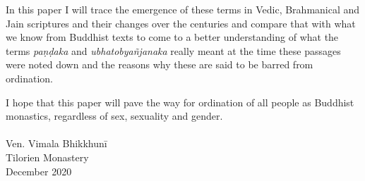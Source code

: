 In this paper I will trace the emergence of these terms in Vedic, Brahmanical and Jain scriptures and their changes over the centuries and compare that with what we know from Buddhist texts to come to a better understanding of what the terms {\em paṇḍaka} and {\em ubhatob­yañ­janaka} really meant at the time these passages were noted down and the reasons why these are said to be barred from ordination.

I hope that this paper will pave the way for ordination of all people as Buddhist monastics, regardless of sex, sexuality and gender.\\\\
Ven. Vimala Bhikkhunī\\
Tilorien Monastery\\
December 2020\\